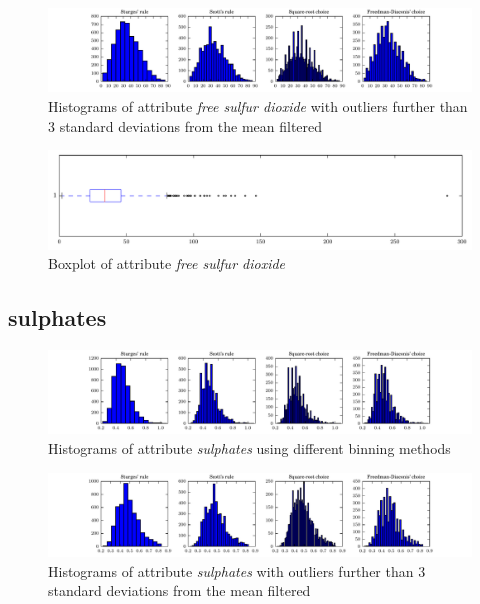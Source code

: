 \documentclass{report}
\begin{document}
\begin{figure}[H]
\includegraphics[width=\textwidth]{histograms/free_sulfur_dioxide_filtered.pdf}
\caption{Histograms of attribute \emph{free sulfur dioxide} with outliers further than 3 standard deviations from the mean filtered}\n\end{figure}

\begin{figure}[H]
\includegraphics[width=\textwidth]{boxplots/free_sulfur_dioxide.pdf}
\caption{Boxplot of attribute \emph{free sulfur dioxide}}\end{figure}

\newpage\subsection{sulphates}
\begin{figure}[H]
\includegraphics[width=\textwidth]{histograms/sulphates.pdf}
\caption{Histograms of attribute \emph{sulphates} using different binning methods}\end{figure}

\begin{figure}[H]
\includegraphics[width=\textwidth]{histograms/sulphates_filtered.pdf}
\caption{Histograms of attribute \emph{sulphates} with outliers further than 3 standard deviations from the mean filtered}\n\end{figure}
\end{document}
